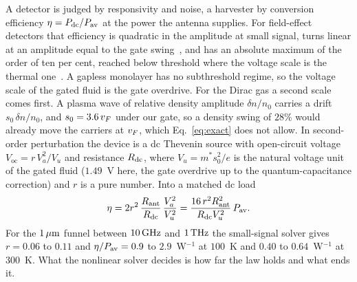 A detector is judged by responsivity and noise, a harvester by conversion
efficiency $\eta=P_{\mathrm{dc}}/P_{\mathrm{av}}$ at the power the antenna supplies.
For field-effect detectors that efficiency is quadratic in the amplitude
at small signal, turns linear at an amplitude equal to the gate
swing~\cite{gutin2012plasmonic,rudin2014theory,but2014nonlinear}, and has
an absolute maximum of the order of ten per cent, reached below threshold
where the voltage scale is the thermal
one~\cite{kachorovskii2013performance}. A gapless monolayer has no
subthreshold regime, so the voltage scale of the gated fluid is the gate
overdrive. For the Dirac gas a second scale comes first. A plasma wave of
relative density amplitude $\delta n/n_{0}$ carries a drift
$s_{0}\,\delta n/n_{0}$, and $s_{0}=3.6\,v_{F}$ under our gate, so a
density swing of $28\%$ would already move the carriers at $v_{F}$, which
Eq.~\eqref{eq:exact} does not allow. In second-order perturbation the
device is a dc Thevenin source with open-circuit voltage
$V_{\mathrm{oc}}=r\,V_{a}^{2}/V_{u}$ and resistance $R_{\mathrm{dc}}$, where
$V_{u}=m^{*}s_{0}^{2}/e$ is the natural voltage unit of the gated fluid
($1.49$~V here, the gate overdrive up to the quantum-capacitance
correction) and $r$ is a pure number. Into a matched dc load
\begin{equation}
\eta=2r^{2}\,\frac{R_{\mathrm{ant}}}{R_{\mathrm{dc}}}\,\frac{V_{a}^{2}}{V_{u}^{2}}
=\frac{16\,r^{2}R_{\mathrm{ant}}^{2}}{R_{\mathrm{dc}} V_{u}^{2}}\,P_{\mathrm{av}} .
\label{eq:eta}
\end{equation}
For the $1\,\mu\mathrm{m}$ funnel between $10\,\mathrm{GHz}$ and $1\,\mathrm{THz}$ the small-signal
solver gives $r=0.06$ to $0.11$ and $\eta/P_{\mathrm{av}}=0.9$ to
$2.9$~W$^{-1}$ at $100$~K and $0.40$ to $0.64$~W$^{-1}$ at $300$~K. What
the nonlinear solver decides is how far the law holds and what ends it.

